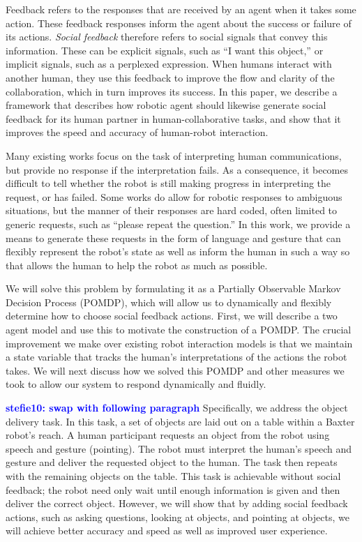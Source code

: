 \documentclass[conference]{IEEEtran}
\newcommand{\stnote}[1]{\textcolor{blue}{\textbf{stefie10: #1}}}
\begin{document}
Feedback refers to the responses that are received by an agent when it takes some action. These feedback responses inform the agent about the success or failure of its actions. \emph{Social feedback} therefore refers to social signals that convey this information. These can be explicit signals, such as ``I want this object,'' or implicit signals, such as a perplexed expression. When humans interact with another human, they use this feedback to improve the flow and clarity of the collaboration, which in turn improves its success. In this paper, we describe a  framework that describes how robotic agent should likewise generate social feedback for its human partner in human-collaborative tasks, and show that it improves the speed and accuracy of human-robot interaction. 

Many existing works focus on the task of interpreting human communications\citep{tellex11,matuszek12,tellex12,misra14}, but provide no response if the interpretation fails. As a consequence, it becomes difficult to tell whether the robot is still making progress in interpreting the request, or has failed. Some works do allow for robotic responses to ambiguous situations, but the manner of their responses are hard coded, often limited to generic requests, such as ``please repeat the question.'' In this work, we provide a means to generate these requests in the form of language and gesture that can flexibly represent the robot's state as well as inform the human in such a way so that allows the human to help the robot as much as possible. 

We will solve this problem by formulating it as a Partially Observable Markov Decision Process (POMDP)\citep{kaelbling99}, which will allow us to dynamically and flexibly determine how to choose social feedback actions. First, we will describe a two agent model and use this to motivate the construction of a POMDP. The crucial improvement we make over existing robot interaction models is that we maintain a state variable that tracks the human's interpretations of the actions the robot takes. We will next discuss how we solved this POMDP and other measures we took to allow our system to respond dynamically and fluidly. 

\stnote{swap with following paragraph}
Specifically, we address the object delivery task. In this task, a set of objects are laid out on a table within a Baxter robot's reach. A human participant requests an object from the robot using speech and gesture (pointing). The robot must interpret the human's speech and gesture and deliver the requested object to the human. The task then repeats with the remaining objects on the table. This task is achievable without social feedback; the robot need only wait until enough information is given and then deliver the correct object. However, we will show that by adding social feedback actions, such as asking questions, looking at objects, and pointing at objects, we will achieve better accuracy and speed as well as improved user experience. 
\end{document}
